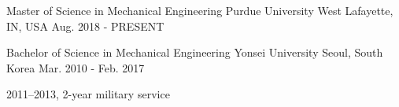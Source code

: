 


\begin{cventries}


\cventry
{Master of Science in Mechanical Engineering} %
{Purdue University} %
{West Lafayette, IN, USA} %
{Aug. 2018 - PRESENT} %
{ %
\begin{cvitems}
\end{cvitems}
}

\cventry
{Bachelor of Science in Mechanical Engineering} %
{Yonsei University} %
{Seoul, South Korea} %
{Mar. 2010 - Feb. 2017} %
{ %
\begin{cvitems}
\item {2011–2013, 2-year military service}
\end{cvitems}
}

\end{cventries}